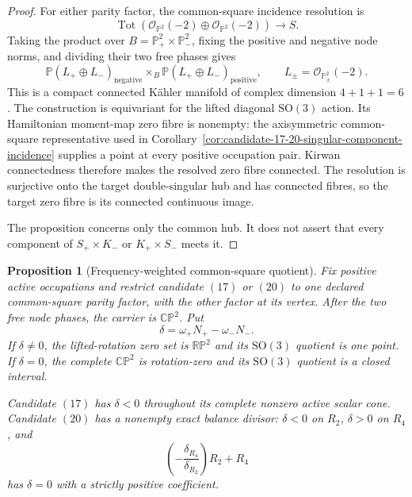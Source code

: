 \documentclass[11pt]{article}
\newtheorem{proposition}[theorem]{Proposition}
\theoremstyle{definition}
\theoremstyle{remark}
\begin{document}
\begin{proof}
For either parity factor, the common-square incidence resolution is
\[
 \operatorname{Tot}\!\left(
   \mathcal O_{\mathbb P^2}(-2)\oplus
   \mathcal O_{\mathbb P^2}(-2)\right)\longrightarrow S.
\]
Taking the product over
\(B=\mathbb P^2_+\times\mathbb P^2_-\), fixing the positive and negative
node norms, and dividing their two free phases gives
\[
 \mathbb P(L_+\oplus L_-)_{\mathrm{negative}}
 \mathop{\times}_{B}
 \mathbb P(L_+\oplus L_-)_{\mathrm{positive}},
 \qquad
 L_\pm=\mathcal O_{\mathbb P^2_\pm}(-2).
\]
This is a compact connected Kähler manifold of complex dimension
\(4+1+1=6\).  The construction is equivariant for the lifted diagonal
\(\mathrm{SO}(3)\) action.  Its Hamiltonian moment-map zero fibre is nonempty:
the axisymmetric common-square representative used in
Corollary~\ref{cor:candidate-17-20-singular-component-incidence} supplies a
point at every positive occupation pair.  Kirwan connectedness therefore
makes the resolved zero fibre connected.  The resolution is surjective onto
the target double-singular hub and has connected fibres, so the target
zero fibre is its connected continuous image.

The proposition concerns only the common hub.  It does not assert that every
component of \(S_+\times K_-\) or \(K_+\times S_-\) meets it.
\end{proof}

\begin{proposition}[Frequency-weighted common-square quotient]
\label{prop:candidate-17-20-common-square-quotient}
Fix positive active occupations and restrict candidate \((17)\) or \((20)\)
to one declared common-square parity factor, with the other factor at its
vertex.  After the two free node phases, the carrier is \(\mathbb{CP}^2\).
Put
\[
 \delta=\omega_+N_+-\omega_-N_-.
\]
If \(\delta\neq0\), the lifted-rotation zero set is
\(\mathbb{RP}^2\) and its \(\mathrm{SO}(3)\) quotient is one point.  If
\(\delta=0\), the complete \(\mathbb{CP}^2\) is rotation-zero and its
\(\mathrm{SO}(3)\) quotient is a closed interval.

Candidate \((17)\) has \(\delta<0\) throughout its complete nonzero active
scalar cone.  Candidate \((20)\) has a nonempty exact balance divisor:
\(\delta<0\) on \(R_2\), \(\delta>0\) on \(R_4\), and
\[
 \left(-\frac{\delta_{R_4}}{\delta_{R_2}}\right)R_2+R_4
\]
has \(\delta=0\) with a strictly positive coefficient.
\end{proposition}
\end{document}
